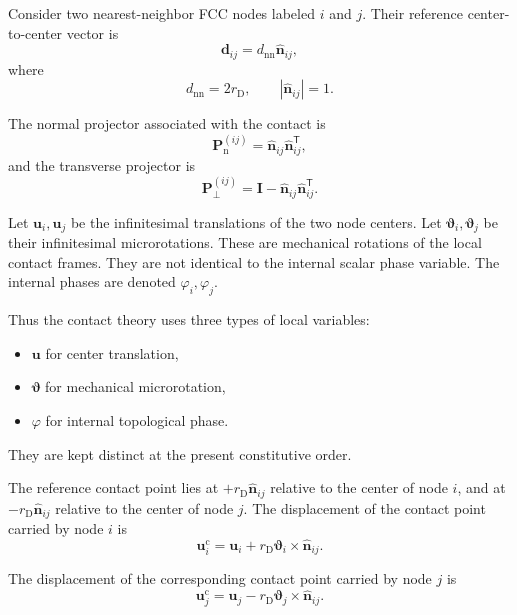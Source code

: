 Consider two nearest-neighbor FCC nodes labeled $i$ and $j$. Their reference center-to-center vector is
\begin{equation}
    \mathbf{d}_{ij} = d_{\mathrm{nn}}\hat{\mathbf{n}}_{ij},
\end{equation}
where
\begin{equation}
    d_{\mathrm{nn}} = 2r_{\mathrm{D}}, \qquad |\hat{\mathbf{n}}_{ij}| = 1.
\end{equation}

The normal projector associated with the contact is
\begin{equation}
    \mathbf{P}_{\mathrm{n}}^{(ij)} = \hat{\mathbf{n}}_{ij}\hat{\mathbf{n}}_{ij}^{\mathsf{T}},
\end{equation}
and the transverse projector is
\begin{equation}
    \mathbf{P}_{\perp}^{(ij)} = \mathbf{I} - \hat{\mathbf{n}}_{ij}\hat{\mathbf{n}}_{ij}^{\mathsf{T}}.
\end{equation}

Let $\mathbf{u}_i, \mathbf{u}_j$ be the infinitesimal translations of the two node centers. Let $\boldsymbol{\vartheta}_i, \boldsymbol{\vartheta}_j$ be their infinitesimal microrotations. These are mechanical rotations of the local contact frames. They are not identical to the internal scalar phase variable. The internal phases are denoted $\varphi_i, \varphi_j$.

Thus the contact theory uses three types of local variables:
\begin{itemize}
    \item $\mathbf{u}$ for center translation,
    \item $\boldsymbol{\vartheta}$ for mechanical microrotation,
    \item $\varphi$ for internal topological phase.
\end{itemize}
They are kept distinct at the present constitutive order.

The reference contact point lies at $+r_{\mathrm{D}}\hat{\mathbf{n}}_{ij}$ relative to the center of node $i$, and at $-r_{\mathrm{D}}\hat{\mathbf{n}}_{ij}$ relative to the center of node $j$. The displacement of the contact point carried by node $i$ is
\begin{equation}
    \mathbf{u}_i^{\mathrm{c}} = \mathbf{u}_i + r_{\mathrm{D}} \boldsymbol{\vartheta}_i \times \hat{\mathbf{n}}_{ij}.
\end{equation}

The displacement of the corresponding contact point carried by node $j$ is
\begin{equation}
    \mathbf{u}_j^{\mathrm{c}} = \mathbf{u}_j - r_{\mathrm{D}} \boldsymbol{\vartheta}_j \times \hat{\mathbf{n}}_{ij}.
\end{equation}

